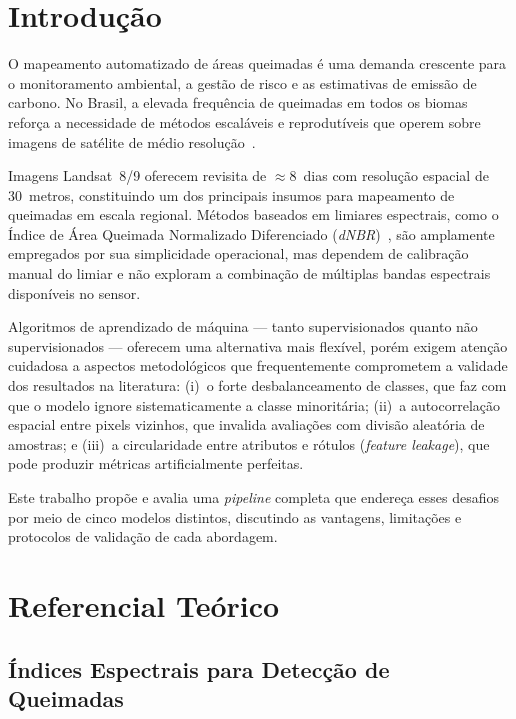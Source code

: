 \documentclass[conference]{IEEEtran}
\begin{document}
\section{Introdução}

O mapeamento automatizado de áreas queimadas é uma demanda crescente para
o monitoramento ambiental, a gestão de risco e as estimativas de emissão
de carbono. No Brasil, a elevada frequência de queimadas em todos os biomas reforça a necessidade de métodos escaláveis e reprodutíveis que
operem sobre imagens de satélite de médio resolução~\cite{b1}.

Imagens Landsat~8/9 oferecem revisita de $\approx8$~dias com resolução
espacial de 30~metros, constituindo um dos principais insumos para
mapeamento de queimadas em escala regional. Métodos baseados em limiares
espectrais, como o Índice de Área Queimada Normalizado Diferenciado
(\textit{dNBR})~\cite{b2}, são amplamente empregados por sua simplicidade
operacional, mas dependem de calibração manual do limiar e não exploram a
combinação de múltiplas bandas espectrais disponíveis no sensor.

Algoritmos de aprendizado de máquina — tanto supervisionados quanto não
supervisionados — oferecem uma alternativa mais flexível, porém exigem
atenção cuidadosa a aspectos metodológicos que frequentemente comprometem
a validade dos resultados na literatura: (i)~o forte desbalanceamento de
classes, que faz com que o modelo ignore sistematicamente a classe
minoritária; (ii)~a autocorrelação espacial entre pixels vizinhos, que
invalida avaliações com divisão aleatória de amostras; e (iii)~a
circularidade entre atributos e rótulos (\textit{feature leakage}), que
pode produzir métricas artificialmente perfeitas.

Este trabalho propõe e avalia uma \textit{pipeline} completa que endereça
esses desafios por meio de cinco modelos distintos, discutindo as vantagens,
limitações e protocolos de validação de cada abordagem.

\section{Referencial Teórico}

\subsection{Índices Espectrais para Detecção de Queimadas}
\end{document}
